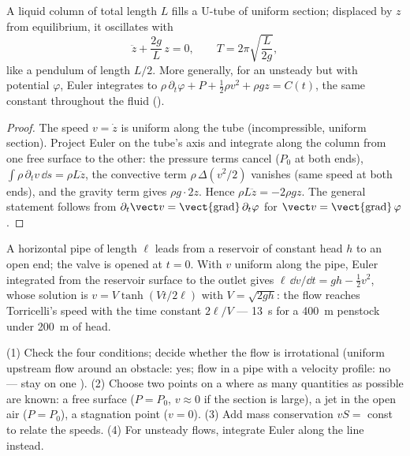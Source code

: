 \begin{proposition}\label{prop:b2:euler-bernoulli:utube}
A liquid column of total length $L$ fills a U-tube of uniform section;
displaced by $z$ from equilibrium, it oscillates with
\[
\ddot z + \frac{2g}{L}\,z = 0 , \qquad T = 2\pi\sqrt{\frac{L}{2g}} ,
\]
like a pendulum of length $L/2$. More generally, for an unsteady but
 with potential $\varphi$, Euler integrates to
$\rho\,\partial_t\varphi + P + \tfrac12\rho v^2 + \rho gz = C(t)$, the same
constant throughout the fluid ().
\end{proposition}

\begin{proof}
The speed $v = \dot z$ is uniform along the tube (incompressible,
uniform section). Project Euler on the tube's axis and integrate along
the column from one free surface to the other: the pressure terms
cancel ($P_0$ at both ends), $\int\rho\,\partial_tv\,\dd s = \rho L\ddot z$, the
convective term $\rho\,\Delta(v^2/2)$ vanishes (same speed at both ends),
and the gravity term gives $\rho g\cdot2z$. Hence $\rho L\ddot z = -2\rho gz$.
The general statement follows from $\partial_t\vect v = \operatorname{\vect{grad}}
\partial_t\varphi$ for $\vect v = \operatorname{\vect{grad}}\varphi$.
\end{proof}

\begin{example}\label{ex:b2:euler-bernoulli:start}
A horizontal pipe of length $\ell$ leads from a reservoir of constant
head $h$ to an open end; the valve is opened at $t = 0$. With $v$ uniform
along the pipe, Euler integrated from the reservoir surface to the
outlet gives $\ell\,\dd v/\dd t = gh - \tfrac12v^2$, whose solution is
$v = V\tanh(Vt/2\ell)$ with $V = \sqrt{2gh}$: the flow reaches Torricelli's
speed with the time constant $2\ell/V$ --- \qty{13}{s} for a \qty{400}{m}
penstock under \qty{200}{m} of head.
\end{example}

\begin{method}\label{met:b2:euler-bernoulli:method}
(1) Check the four conditions; decide whether the flow is irrotational
(uniform upstream flow around an obstacle: yes; flow in a pipe with a
velocity profile: no --- stay on one ). (2) Choose two points
on a  where as many quantities as possible are known: a free
surface ($P = P_0$, $v \approx 0$ if the section is large), a jet in the
open air ($P = P_0$), a stagnation point ($v = 0$). (3) Add mass
conservation $vS = $ const to relate the speeds. (4) For unsteady
flows, integrate Euler along the line instead.
\end{method}

